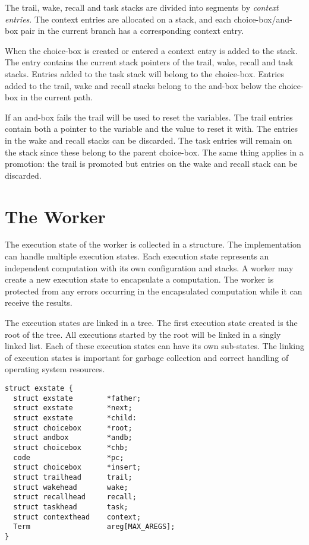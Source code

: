 The trail, wake, recall and task stacks are divided into segments by
{\em context entries}. The context entries are allocated on a stack,
and each choice-box/and-box pair in the current branch has a
corresponding context entry.

When the choice-box is created or entered a context entry is added to
the stack. The entry contains the current stack pointers of the trail,
wake, recall and task stacks. Entries added to the task stack will
belong to the choice-box. Entries added to the trail, wake and recall
stacks belong to the and-box below the choice-box in the current
path.

If an and-box fails the trail will be used to reset the variables. The
trail entries contain both a pointer to the variable and the value to reset
it with. The entries in the wake and recall stacks can be discarded. The task
entries will remain on the stack since these belong to the parent choice-box.
The same thing applies in a promotion: the trail is promoted but entries on
the wake and recall stack can be discarded.


\section{The Worker}

The execution state of the worker is collected in a structure. The
implementation can handle multiple execution states. Each execution state
represents an independent computation with its own configuration and
stacks. A worker may create a new execution state to encapsulate a 
computation. The worker is protected from any errors occurring in the
encapsulated computation while it can receive the results.

The execution states are linked in a tree. The first execution state
created is the root of the tree. All executions started by the root
will be linked in a singly linked list.  Each of these execution
states can have its own sub-states. The linking of execution states is
important for garbage collection and correct handling of operating
system resources.

\begin{verbatim}
struct exstate {
  struct exstate        *father;
  struct exstate        *next;
  struct exstate        *child:
  struct choicebox      *root;
  struct andbox         *andb;
  struct choicebox      *chb;
  code                  *pc;
  struct choicebox      *insert;
  struct trailhead      trail;
  struct wakehead       wake;
  struct recallhead     recall;
  struct taskhead       task;
  struct contexthead    context;
  Term                  areg[MAX_AREGS];
}
\end{verbatim}


